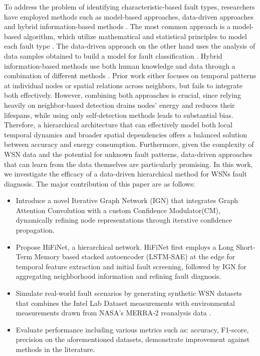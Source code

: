 To address the problem of identifying characteristic-based fault types, researchers have employed methods such as model-based approaches, data-driven approaches and hybrid information-based methods \cite{Shi2024}. The most common approach is a model-based algorithm, which utilize mathematical and statistical principles to model each fault type \cite{Panda2014, Ahmad2024}. The data-driven approach on the other hand uses the analysis of data samples obtained to build a model for fault classification \cite{Saeed2021, Prasad2023}. Hybrid information-based methods use both human knowledge and data through a combination of different methods \cite{Sun2023, Shi2024}. Prior work either focuses on temporal patterns at individual nodes or spatial relations across neighbors, but fails to integrate both effectively. However, combining both approaches is crucial, since relying heavily on neighbor-based detection drains nodes’ energy and reduces their lifespans, while using only self-detection methods leads to substantial bias. Therefore, a hierarchical architecture that can effectively model both local temporal dynamics and broader spatial dependencies offers a balanced solution between accuracy and energy consumption. Furthermore, given the complexity of WSN data and the potential for unknown fault patterns, data-driven approaches that can learn from the data themselves are particularly promising. In this work, we investigate the efficacy of a data-driven hierarchical method for WSNs fault diagnosis. The major contribution of this paper are as follows:

\begin{itemize}
  \item Introduce a novel Iterative Graph Network (IGN) that integrates Graph Attention Convolution with a custom Confidence Modulator(CM), dynamically refining node representations through iterative confidence propagation.
  \item Propose HiFiNet, a hierarchical network. HiFiNet first employs a Long Short-Term Memory based stacked autoencoder (LSTM-SAE) at the edge for temporal feature extraction and initial fault screening, followed by IGN for aggregating neighborhood information and refining fault diagnosis.
  \item Simulate real-world fault scenarios by generating synthetic WSN datasets that combines the Intel Lab Dataset measurements \cite{Intel2004} with environmental measurements drawn from NASA’s MERRA‑2 reanalysis data \cite{GMAO2015}.
  \item Evaluate performance including various metrics such as: accuracy, F1-score, precision on the aforementioned datasets, demonstrate improvement against methods in the literature.
\end{itemize}
